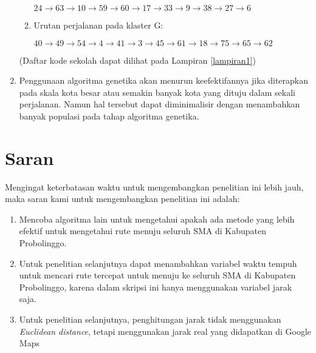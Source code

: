 \begin{enumerate}
\begin{enumerate}
$24\rightarrow63\rightarrow10\rightarrow59\rightarrow60\rightarrow17\rightarrow33\rightarrow9\rightarrow38\rightarrow27\rightarrow6$

\item Urutan perjalanan pada klaster G:

$40\rightarrow49\rightarrow54\rightarrow4\rightarrow41\rightarrow3\rightarrow45\rightarrow61\rightarrow18\rightarrow75\rightarrow65\rightarrow62$

\end{enumerate}

(Daftar kode sekolah dapat dilihat pada Lampiran \ref{lampiran1})

\item Penggunaan algoritma genetika akan menurun keefektifannya jika diterapkan pada skala kota besar atau semakin banyak kota yang dituju dalam sekali perjalanan. Namun hal tersebut dapat diminimalisir dengan menambahkan banyak populasi pada tahap algoritma genetika.

\end{enumerate}

\section{Saran}

Mengingat keterbatasan waktu untuk mengembangkan penelitian ini lebih jauh, maka saran kami untuk mengembangkan penelitian ini adalah:
\begin{enumerate}
    \item Mencoba algoritma lain untuk mengetahui apakah ada metode yang lebih efektif untuk mengetahui rute menuju seluruh SMA di Kabupaten Probolinggo.
    \item Untuk penelitian selanjutnya dapat menambahkan variabel waktu tempuh untuk mencari rute tercepat untuk menuju ke seluruh SMA di Kabupaten Probolinggo, karena dalam skripsi ini hanya menggunakan variabel jarak saja.
    \item Untuk penelitian selanjutnya, penghitungan jarak tidak menggunakan \textit{Euclidean distance}, tetapi menggunakan jarak real yang didapatkan di Google Maps
\end{enumerate}